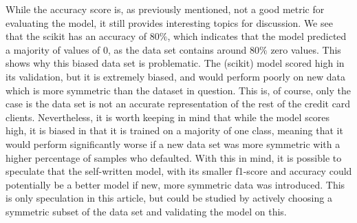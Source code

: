 \documentclass[a4paper,10pt,english]{article}
\begin{document}
While the accuracy score is, as previously mentioned, not a good metric for evaluating the model, it still provides interesting topics for discussion. We see that the scikit has an accuracy of $80\%$, which indicates that the model predicted a majority of values of $0$, as the data set contains around $80\%$ zero values. This shows why this biased data set is problematic. The (scikit) model scored high in its validation, but it is extremely biased, and would perform poorly on new data which is more symmetric than the dataset in question. This is, of course, only the case is the data set is not an accurate representation of the rest of the credit card clients. Nevertheless, it is worth keeping in mind that while the model scores high, it is biased in that it is trained on a majority of one class, meaning that it would perform significantly worse if a new data set was more symmetric with a higher percentage of samples who defaulted. With this in mind, it is possible to speculate that the self-written model, with its smaller f1-score and accuracy could potentially be a better model if new, more symmetric data was introduced. This is only speculation in this article, but could be studied by actively choosing a symmetric subset of the data set and validating the model on this.
\end{document}
